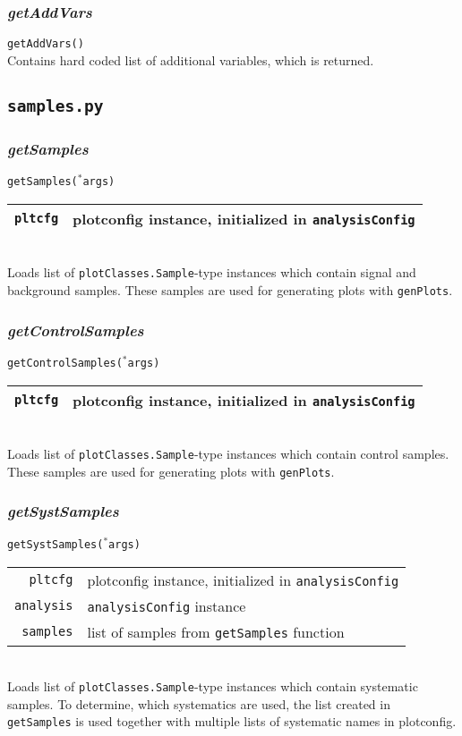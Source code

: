 \documentclass[12pt, a4paper]{article}
\newcommand{\args}{$^*$args}
\begin{document}
\subsubsection{\textit{getAddVars}}
\texttt{getAddVars()}\\
Contains hard coded list of additional variables, which is returned.


\subsection{\texttt{samples.py}}
\label{configs_samples}

\subsubsection{\textit{getSamples}}
\texttt{getSamples(\args)}\\
\begin{tabular}{r|l}
\hline
\texttt{pltcfg} & plotconfig instance, initialized in \texttt{analysisConfig}\\
\hline
\end{tabular}
\\
Loads list of \texttt{plotClasses.Sample}-type instances which contain signal and background samples. These samples are used for generating plots with \texttt{genPlots}.


\subsubsection{\textit{getControlSamples}}
\texttt{getControlSamples(\args)}\\
\begin{tabular}{r|l}
\hline
\texttt{pltcfg} & plotconfig instance, initialized in \texttt{analysisConfig}\\
\hline
\end{tabular}
\\
Loads list of \texttt{plotClasses.Sample}-type instances which contain control samples.\\ These samples are used for generating plots with \texttt{genPlots}.


\subsubsection{\textit{getSystSamples}}
\texttt{getSystSamples(\args)}\\
\begin{tabular}{r|l}
\hline
\texttt{pltcfg} & plotconfig instance, initialized in \texttt{analysisConfig}\\
\texttt{analysis} & \texttt{analysisConfig} instance \\
\texttt{samples} & list of samples from \texttt{getSamples} function \\
\hline
\end{tabular}
\\
Loads list of \texttt{plotClasses.Sample}-type instances which contain systematic samples. To determine, which systematics are used, the list created in \texttt{getSamples} is used together with multiple lists of systematic names in plotconfig.\\
\end{document}
